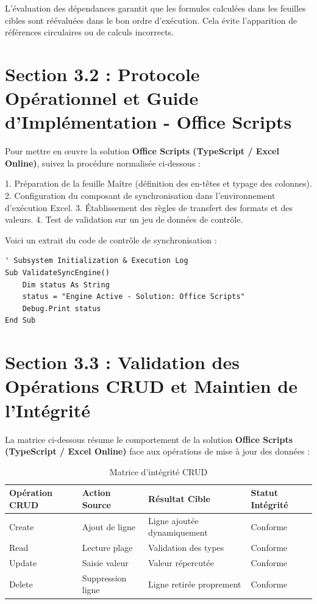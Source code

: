 \documentclass[12pt,a4paper]{report}
\begin{document}
L'évaluation des dépendances garantit que les formules calculées dans les feuilles cibles sont réévaluées dans le bon ordre d'exécution. Cela évite l'apparition de références circulaires ou de calculs incorrects.


\section{Section 3.2 : Protocole Opérationnel et Guide d'Implémentation - Office Scripts}
Pour mettre en œuvre la solution \textbf{Office Scripts (TypeScript / Excel Online)}, suivez la procédure normalisée ci-dessous :

1. Préparation de la feuille Maître (définition des en-têtes et typage des colonnes).
2. Configuration du composant de synchronisation dans l'environnement d'exécution Excel.
3. Établissement des règles de transfert des formats et des valeurs.
4. Test de validation sur un jeu de données de contrôle.

Voici un extrait du code de contrôle de synchronisation :
\begin{lstlisting}[caption=Code de controle operationnel]
' Subsystem Initialization & Execution Log
Sub ValidateSyncEngine()
    Dim status As String
    status = "Engine Active - Solution: Office Scripts"
    Debug.Print status
End Sub
\end{lstlisting}


\section{Section 3.3 : Validation des Opérations CRUD et Maintien de l'Intégrité}
La matrice ci-dessous résume le comportement de la solution \textbf{Office Scripts (TypeScript / Excel Online)} face aux opérations de mise à jour des données :

\begin{table}[h]
\centering
\begin{tabular}{@{}llll@{}}
\toprule
\textbf{Opération CRUD} & \textbf{Action Source} & \textbf{Résultat Cible} & \textbf{Statut Intégrité} \\ \midrule
Create & Ajout de ligne & Ligne ajoutée dynamiquement & Conforme \\
Read & Lecture plage & Validation des types & Conforme \\
Update & Saisie valeur & Valeur répercutée & Conforme \\
Delete & Suppression ligne & Ligne retirée proprement & Conforme \\ \bottomrule
\end{tabular}
\caption{Matrice d'intégrité CRUD}
\end{table}
\end{document}
